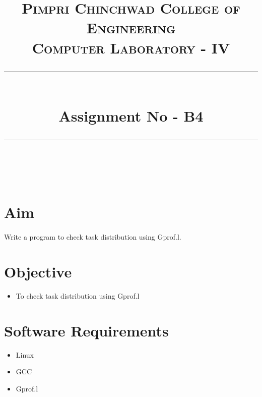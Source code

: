 \documentclass[a4paper,12pt]{article}
\title{
	\normalfont \normalsize 
	\textsc{Pimpri Chinchwad College of Engineering \\ 
		Computer Laboratory - IV} \\
	[10pt] 
	\rule{\linewidth}{0.5pt} \\[6pt] 
	\huge Assignment No - B4 \\
	\rule{\linewidth}{2pt}  \\[10pt]
}
\author{}
\date{\normalsize}
\newenvironment{codefont}{\fontfamily{ccr}\selectfont}{\par}
\begin{document}
\maketitle

\section{Aim}
	\paragraph{} Write a program to check task distribution using Gprof.l.
	
\section{Objective}
	\begin{itemize}
		\item To check task distribution using Gprof.l
	\end{itemize}
	
\section{Software Requirements}
	\begin{itemize}
		\item	Linux
		\item	GCC
		\item   Gprof.l
	\end{itemize}
	
\end{document}
